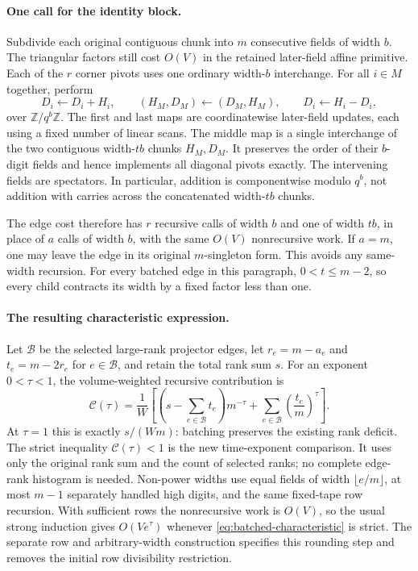 \paragraph{One call for the identity block.}
Subdivide each original contiguous chunk into $m$ consecutive fields
of width $b$. The triangular factors still cost $O(V)$ in the retained
later-field affine primitive. Each of the $r$ corner pivots uses one
ordinary width-$b$ interchange. For all $i\in M$ together, perform
\[
 D_i\leftarrow D_i+H_i,
 \qquad
 (H_M,D_M)\leftarrow(D_M,H_M),
 \qquad
 D_i\leftarrow H_i-D_i,
\]
over $\mathbb Z/q^b\mathbb Z$.
The first and last maps are coordinatewise later-field updates, each
using a fixed number of linear scans. The middle map is a single
interchange of the two contiguous width-$tb$ chunks $H_M,D_M$.
It preserves the order of their $b$-digit fields and hence implements
all diagonal pivots exactly. The intervening fields are spectators.
In particular, addition is componentwise modulo $q^b$, not addition
with carries across the concatenated width-$tb$ chunks.

The edge cost therefore has $r$ recursive calls of width $b$ and one
of width $tb$, in place of $a$ calls of width $b$, with the same
$O(V)$ nonrecursive work. If $a=m$, one may leave the edge in its
original $m$-singleton form. This avoids any same-width recursion.
For every batched edge in this paragraph, $0<t\le m-2$, so every
child contracts its width by a fixed factor less than one.

\paragraph{The resulting characteristic expression.}
Let $\mathcal B$ be the selected large-rank projector edges, let
$r_e=m-a_e$ and $t_e=m-2r_e$ for $e\in\mathcal B$, and retain the
total rank sum $s$. For an exponent $0<\tau<1$, the volume-weighted
recursive contribution is
\begin{equation}\label{eq:batched-characteristic}
 \mathcal C(\tau)
 =\frac1W\left[
   \left(s-\sum_{e\in\mathcal B}t_e\right)m^{-\tau}
   +\sum_{e\in\mathcal B}\left(\frac{t_e}{m}\right)^\tau
   \right].
\end{equation}
At $\tau=1$ this is exactly $s/(Wm)$: batching preserves the existing
rank deficit. The strict inequality $\mathcal C(\tau)<1$ is the
new time-exponent comparison. It uses only the original rank sum and
the count of selected ranks; no complete edge-rank histogram is needed.
Non-power widths use equal fields of width $\lfloor e/m\rfloor$,
at most $m-1$ separately handled high digits, and the same fixed-tape
row recursion. With sufficient rows the nonrecursive work is $O(V)$,
so the usual strong induction gives $O(Ve^\tau)$ whenever
\eqref{eq:batched-characteristic} is strict. The separate row and
arbitrary-width construction specifies this rounding step and removes
the initial row divisibility restriction.
